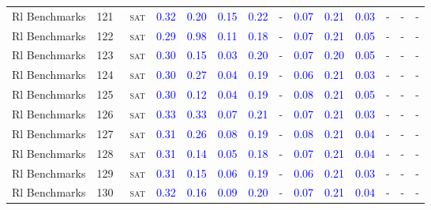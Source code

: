 \begin{center}
{\begin{longtable}{@{}llllllllllllll@{}}
Rl Benchmarks & 121 & ~\textsc{sat} & \textcolor{blue}{0.32} & \textcolor{blue}{0.20} & \textcolor{blue}{0.15} & \textcolor{blue}{0.22} & - & \textcolor{blue}{0.07} & \textcolor{blue}{0.21} & \textcolor{blue}{0.03} & - & - & - \\
Rl Benchmarks & 122 & ~\textsc{sat} & \textcolor{blue}{0.29} & \textcolor{blue}{0.98} & \textcolor{blue}{0.11} & \textcolor{blue}{0.18} & - & \textcolor{blue}{0.07} & \textcolor{blue}{0.21} & \textcolor{blue}{0.05} & - & - & - \\
Rl Benchmarks & 123 & ~\textsc{sat} & \textcolor{blue}{0.30} & \textcolor{blue}{0.15} & \textcolor{blue}{0.03} & \textcolor{blue}{0.20} & - & \textcolor{blue}{0.07} & \textcolor{blue}{0.20} & \textcolor{blue}{0.05} & - & - & - \\
Rl Benchmarks & 124 & ~\textsc{sat} & \textcolor{blue}{0.30} & \textcolor{blue}{0.27} & \textcolor{blue}{0.04} & \textcolor{blue}{0.19} & - & \textcolor{blue}{0.06} & \textcolor{blue}{0.21} & \textcolor{blue}{0.03} & - & - & - \\
Rl Benchmarks & 125 & ~\textsc{sat} & \textcolor{blue}{0.30} & \textcolor{blue}{0.12} & \textcolor{blue}{0.04} & \textcolor{blue}{0.19} & - & \textcolor{blue}{0.08} & \textcolor{blue}{0.21} & \textcolor{blue}{0.05} & - & - & - \\
Rl Benchmarks & 126 & ~\textsc{sat} & \textcolor{blue}{0.33} & \textcolor{blue}{0.33} & \textcolor{blue}{0.07} & \textcolor{blue}{0.21} & - & \textcolor{blue}{0.07} & \textcolor{blue}{0.21} & \textcolor{blue}{0.03} & - & - & - \\
Rl Benchmarks & 127 & ~\textsc{sat} & \textcolor{blue}{0.31} & \textcolor{blue}{0.26} & \textcolor{blue}{0.08} & \textcolor{blue}{0.19} & - & \textcolor{blue}{0.08} & \textcolor{blue}{0.21} & \textcolor{blue}{0.04} & - & - & - \\
Rl Benchmarks & 128 & ~\textsc{sat} & \textcolor{blue}{0.31} & \textcolor{blue}{0.14} & \textcolor{blue}{0.05} & \textcolor{blue}{0.18} & - & \textcolor{blue}{0.07} & \textcolor{blue}{0.21} & \textcolor{blue}{0.04} & - & - & - \\
Rl Benchmarks & 129 & ~\textsc{sat} & \textcolor{blue}{0.31} & \textcolor{blue}{0.15} & \textcolor{blue}{0.06} & \textcolor{blue}{0.19} & - & \textcolor{blue}{0.06} & \textcolor{blue}{0.21} & \textcolor{blue}{0.03} & - & - & - \\
Rl Benchmarks & 130 & ~\textsc{sat} & \textcolor{blue}{0.32} & \textcolor{blue}{0.16} & \textcolor{blue}{0.09} & \textcolor{blue}{0.20} & - & \textcolor{blue}{0.07} & \textcolor{blue}{0.21} & \textcolor{blue}{0.04} & - & - & - \\

\end{longtable}}
\end{center}
